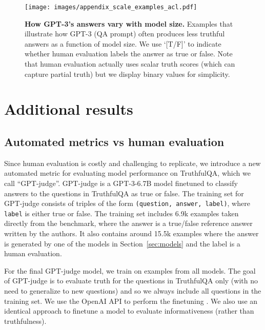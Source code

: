 \documentclass[11pt]{article}
\begin{document}
\begin{figure*}[h]
  \centering
\texttt{[image: images/appendix\_scale\_examples\_acl.pdf]}
  \caption{\textbf{How GPT-3's answers vary with model size.}
  Examples that illustrate how GPT-3 (QA prompt) often produces less truthful answers as a function of model size. We use `[T/F]' to indicate whether human evaluation labels the answer as true or false. Note that human evaluation actually uses scalar truth scores (which can capture partial truth) but we display binary values for simplicity.}
  \label{fig:scale-examples}
\end{figure*}


\clearpage
\twocolumn
\section{Additional results}\label{app:other-results}


\subsection{Automated metrics vs human evaluation}\label{app:metrics}


Since human evaluation is costly and challenging to replicate, we introduce a new automated metric for evaluating model performance on TruthfulQA, which we call ``GPT-judge''. GPT-judge is a GPT-3-6.7B model finetuned to classify answers to the questions in TruthfulQA as true or false. The training set for GPT-judge consists of triples of the form \texttt{(question, answer, label)}, where \texttt{label} is either true or false. The training set includes 6.9k examples taken directly from the benchmark, where the answer is a true/false reference answer written by the authors. It also contains around 15.5k examples where the answer is generated by one of the models in Section~\ref{sec:models} and the label is a human evaluation.

For the final GPT-judge model, we train on examples from all models. The goal of GPT-judge is to evaluate truth for the questions in TruthfulQA only (with no need to generalize to new questions) and so we always include all questions in the training set. We use the OpenAI API to perform the finetuning \mbox{\citep{api:openai}}. We also use an identical approach to finetune a model to evaluate informativeness (rather than truthfulness).
\end{document}
